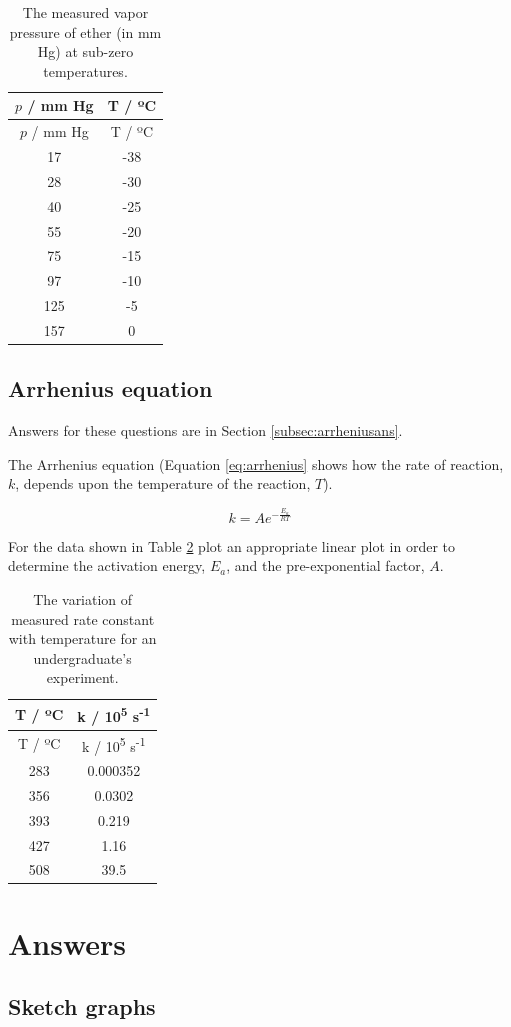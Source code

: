 \documentclass[
]{book}
\begin{document}
\begin{longtable}[]{@{}cc@{}}
\caption{\label{tab:ether} The measured vapor pressure of ether (in mm Hg) at sub-zero temperatures.}\tabularnewline
\toprule
\(p\) / mm Hg & T / ºC\tabularnewline
\midrule
\endfirsthead
\toprule
\(p\) / mm Hg & T / ºC\tabularnewline
\midrule
\endhead
17 & -38\tabularnewline
28 & -30\tabularnewline
40 & -25\tabularnewline
55 & -20\tabularnewline
75 & -15\tabularnewline
97 & -10\tabularnewline
125 & -5\tabularnewline
157 & 0\tabularnewline
\bottomrule
\end{longtable}

\hypertarget{subsec:arrhenius}{%
\subsection{Arrhenius equation}\label{subsec:arrhenius}}

Answers for these questions are in Section \ref{subsec:arrheniusans}.

The Arrhenius equation (Equation \eqref{eq:arrhenius} shows how the rate of reaction, \(k\), depends upon the temperature of the reaction, \(T\)).

\begin{equation}
k=Ae^{-\frac{E_a}{RT}}
\label{eq:arrhenius}
\end{equation}

For the data shown in Table \ref{tab:arrhenius} plot an appropriate linear plot in order to determine the activation energy, \(E_a\), and the pre-exponential factor, \(A\).

\begin{longtable}[]{@{}cc@{}}
\caption{\label{tab:arrhenius} The variation of measured rate constant with temperature for an undergraduate's experiment.}\tabularnewline
\toprule
T / ºC & k / 10\textsuperscript{5} s\textsuperscript{-1}\tabularnewline
\midrule
\endfirsthead
\toprule
T / ºC & k / 10\textsuperscript{5} s\textsuperscript{-1}\tabularnewline
\midrule
\endhead
283 & 0.000352\tabularnewline
356 & 0.0302\tabularnewline
393 & 0.219\tabularnewline
427 & 1.16\tabularnewline
508 & 39.5\tabularnewline
\bottomrule
\end{longtable}

\hypertarget{sec:Answers3}{%
\section{Answers}\label{sec:Answers3}}

\hypertarget{subsec:sketchans}{%
\subsection{Sketch graphs}\label{subsec:sketchans}}
\end{document}
